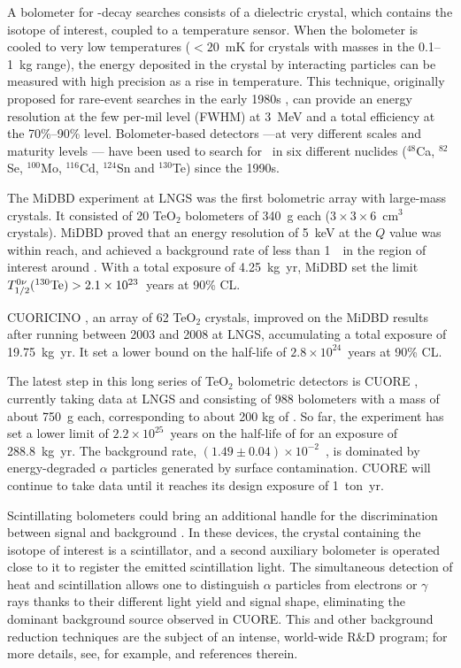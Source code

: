 %
A bolometer for \bbonu-decay searches consists of a dielectric crystal, which contains the isotope of interest, coupled to a temperature sensor. When the bolometer is cooled to very low temperatures ($<20$~mK for crystals with masses in the 0.1--1~kg range), the energy deposited in the crystal by interacting particles can be measured with high precision as a rise in temperature. This technique, originally proposed for rare-event searches in the early 1980s \cite{Fiorini:1983yj}, can provide an energy resolution at the few per-mil level (FWHM) at 3~MeV and a total efficiency at the 70\%--90\% level. Bolometer-based detectors ---\thinspace at very different scales and maturity levels \thinspace--- have been used to search for \bbonu\ in six different nuclides ($^{48}$Ca, $^{82}$Se, $^{100}$Mo, $^{116}$Cd, $^{124}$Sn and $^{130}$Te) since the 1990s.

The MiDBD experiment \cite{Arnaboldi:2002te} at LNGS was the first bolometric array with large-mass crystals. It consisted of 20 TeO$_2$ bolometers of 340~g each ($3\times3\times6$~cm$^3$ crystals). MiDBD proved that an energy resolution of 5~keV at the $Q$ value was within reach, and achieved a background rate of less than 1~\ckky\ in the region of interest around \Qbb. With a total exposure of 4.25~kg~yr, MiDBD set the limit $T_{1/2}^{0\nu}(^{130}\mathrm{Te}) > 2.1\times10^{23}$~years at 90\% CL. 

CUORICINO \cite{Andreotti:2010vj}, an array of 62 TeO$_2$ crystals, improved on the MiDBD results after running between 2003 and 2008 at LNGS, accumulating a total exposure of 19.75~kg~yr. It set a lower bound on the  half-life of $2.8\times10^{24}$~years at 90\% CL. 

The latest step in this long series of TeO$_2$ bolometric detectors is CUORE \cite{CUORE:2021mvw}, currently taking data at LNGS and consisting of 988 bolometers with a mass of about 750~g each, corresponding to about 200 kg of . So far, the experiment has set a lower limit of $2.2\times10^{25}$~years on the half-life of  for an exposure of 288.8~kg~yr. The background rate, $(1.49\pm0.04)\times 10^{-2}$~\ckky, is dominated by energy-degraded $\alpha$ particles generated by surface contamination. CUORE will continue to take data until it reaches its design  exposure of 1~ton~yr. 

Scintillating bolometers could bring an additional handle for the discrimination between signal and background \cite{Pirro:2005ar}. In these devices, the crystal containing the isotope of interest is a scintillator, and a second auxiliary bolometer is operated close to it to register the emitted scintillation light. The simultaneous detection of heat and scintillation allows one to distinguish $\alpha$ particles from electrons or $\gamma$ rays thanks to their different light yield and signal shape, eliminating the dominant background source observed in CUORE. This and other background reduction techniques are the subject of an intense, world-wide R\&D program; for more details, see, for example, \cite{Zolotarova:2021inw} and references therein.

